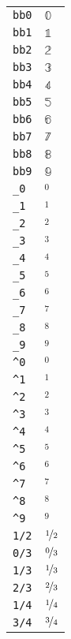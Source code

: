 \begin{longtable}{ll}
\texttt{bb0}&${}{\mathbb{0}}{}$\\
\texttt{bb1}&${}{\mathbb{1}}{}$\\
\texttt{bb2}&${}{\mathbb{2}}{}$\\
\texttt{bb3}&${}{\mathbb{3}}{}$\\
\texttt{bb4}&${}{\mathbb{4}}{}$\\
\texttt{bb5}&${}{\mathbb{5}}{}$\\
\texttt{bb6}&${}{\mathbb{6}}{}$\\
\texttt{bb7}&${}{\mathbb{7}}{}$\\
\texttt{bb8}&${}{\mathbb{8}}{}$\\
\texttt{bb9}&${}{\mathbb{9}}{}$\\
\texttt{\_0}&${}_0 {}$\\
\texttt{\_1}&${}_1 {}$\\
\texttt{\_2}&${}_2 {}$\\
\texttt{\_3}&${}_3 {}$\\
\texttt{\_4}&${}_4 {}$\\
\texttt{\_5}&${}_5 {}$\\
\texttt{\_6}&${}_6 {}$\\
\texttt{\_7}&${}_7 {}$\\
\texttt{\_8}&${}_8 {}$\\
\texttt{\_9}&${}_9 {}$\\
\texttt{\textasciicircum 0}&${}^0 {}$\\
\texttt{\textasciicircum 1}&${}^1 {}$\\
\texttt{\textasciicircum 2}&${}^2 {}$\\
\texttt{\textasciicircum 3}&${}^3 {}$\\
\texttt{\textasciicircum 4}&${}^4 {}$\\
\texttt{\textasciicircum 5}&${}^5 {}$\\
\texttt{\textasciicircum 6}&${}^6 {}$\\
\texttt{\textasciicircum 7}&${}^7 {}$\\
\texttt{\textasciicircum 8}&${}^8 {}$\\
\texttt{\textasciicircum 9}&${}^9 {}$\\
\texttt{1/2}&${}\nicefrac{1}{2} {}$\\
\texttt{0/3}&${}\nicefrac{0}{3} {}$\\
\texttt{1/3}&${}\nicefrac{1}{3} {}$\\
\texttt{2/3}&${}\nicefrac{2}{3} {}$\\
\texttt{1/4}&${}\nicefrac{1}{4} {}$\\
\texttt{3/4}&${}\nicefrac{3}{4} {}$\\

\end{longtable}
